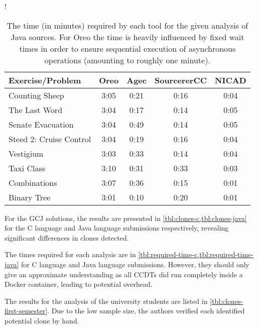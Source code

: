\documentclass[10pt,journal,compsoc]{IEEEtran}
\def\todo#1{\textcolor{brown!80!yellow!70!black!90!red}{[\textsc{todo}: \textsf{#1}]}}
\begin{document}
\begin{table}
  \centering\resizebox\linewidth!{\begin{tabular}{l cccc}
    \toprule
     Exercise/Problem & Oreo &  Agec & SourcererCC & NICAD\\
    \midrule
    Counting Sheep & 3:05 & 0:21 & 0:16 & 0:04\\
    The Last Word & 3:04 & 0:17 & 0:14 & 0:05 \\
    Senate Evacuation & 3:04 & 0:49 & 0:14 & 0:05 \\
    Steed 2: Cruise Control & 3:04 & 0:19 & 0:16 & 0:04\\
    Vestigium & 3:03 & 0:33 & 0:14 & 0:04 \\
    \midrule
    Taxi Class   & 3:10 & 0:31 & 0:33 & 0:03 \\
    Combinations & 3:07 & 0:36 & 0:15 & 0:01 \\
    Binary Tree  & 3:01 & 0:10 & 0:20 & 0:01 \\
    \bottomrule
  \end{tabular}}\medskip
  \caption{The time (in minutes) required by each tool for the given analysis of Java sources. For Oreo the time is heavily influenced by fixed wait times in order to ensure sequential execution of asynchronous operations (amounting to roughly one minute).} %
  \label{tbl:required-time-java}
\end{table}


For the GCJ solutions, the results are presented in \cref{tbl:clones-c,tbl:clones-java} for the C language and Java language submissions respectively, revealing significant differences in clones detected.

The times required for each analysis are in \cref{tbl:required-time-c,tbl:required-time-java} for C language and Java language submissions. However, they should only give an approximate understanding as all CCDTs did run completely inside a Docker container, leading to potential overhead.

The results for the analysis of the university students are listed in \cref{tbl:clones-first-semester}.
Due to the low sample size, the authors verified each identified potential clone by hand.
\end{document}
